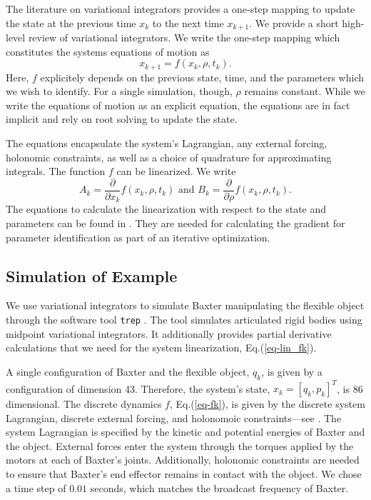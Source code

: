 \documentclass[runningheads,a4paper]{llncs}
\begin{document}
The literature on variational integrators \cite{marsden_west} provides a one-step mapping to update the state at the previous time $x_k$ to the next time $x_{k+1}$.  We provide a short high-level review of variational integrators.  We write the one-step mapping which constitutes the systems equations of motion as 
\begin{equation}
x_{k+1} = f(x_k,\rho,t_k).
\label{eq-fk}
\end{equation}
Here, $f$ explicitely depends on the previous state, time, and the parameters which we wish to identify. For a single simulation, though, $\rho$ remains constant.  While we write the equations of motion as an explicit equation, the equations are in fact implicit and rely on root solving to update the state. 

The equations encapsulate the system's Lagrangian, any external forcing, holonomic constraints, as well as a choice of quadrature for approximating integrals.  The function $f$ can be linearized. We write 
\begin{equation}
A_k = \frac{\partial}{\partial x_k}f(x_k,\rho,t_k) \textrm{ and } B_k = \frac{\partial}{\partial \rho}f(x_k,\rho,t_k).
\label{eq-lin_fk}
\end{equation}
The equations to calculate the linearization with respect to the state and parameters can be found in \cite{caldwell_coleman_correll_iros}. They are needed for calculating the gradient for parameter identification as part of an iterative optimization.

\subsection{Simulation of Example}
We use variational integrators to simulate Baxter manipulating the flexible object through the software tool \texttt{trep} \cite{johnson_murphey_scalable}.  The tool simulates articulated rigid bodies using midpoint variational integrators.  It additionally provides partial derivative calculations that we need for the system linearization, Eq.(\ref{eq-lin_fk}). 

A single configuration of Baxter and the flexible object, $q_k$, is given by a configuration of dimension 43. Therefore, the system's state,  $x_k = [q_k,p_k]^T$, is 86 dimensional. The discrete dynamics $f$, Eq.(\ref{eq-fk}), is given by the discrete system Lagrangian, discrete external forcing, and holonomoic constraints---see \cite{caldwell_coleman_correll_iros,marsden_west}.  The system Lagrangian is specified by the kinetic and potential energies of Baxter and the object.  External forces enter the system through the torques applied by the motors at each of Baxter's joints.  Additionally, holonomic constraints are needed to ensure that Baxter's end effector remains in contact with the object.  We chose a time step of $0.01$ seconds, which matches the broadcast frequency of Baxter. 
\end{document}
